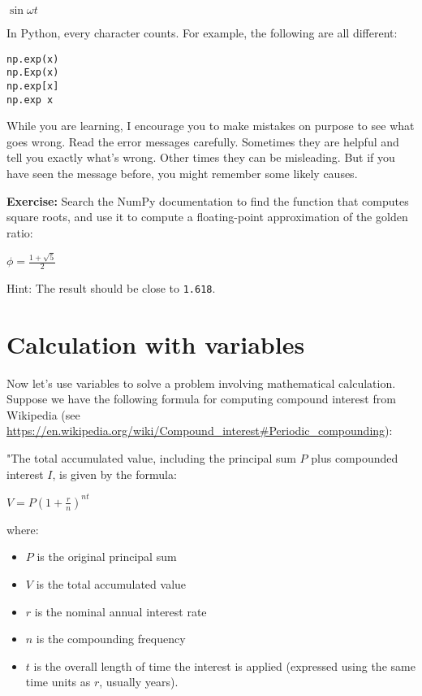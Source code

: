 \(\sin \omega t\)

In Python, every character counts. For example, the following are all
different:

\begin{lstlisting}[style=output]
np.exp(x)
np.Exp(x)
np.exp[x]
np.exp x
\end{lstlisting}

While you are learning, I encourage you to make mistakes on purpose to
see what goes wrong. Read the error messages carefully. Sometimes they
are helpful and tell you exactly what's wrong. Other times they can be
misleading. But if you have seen the message before, you might remember
some likely causes.

\textbf{Exercise:} Search the NumPy documentation to find the function
that computes square roots, and use it to compute a floating-point
approximation of the golden ratio:

\(\phi = \frac{1 + \sqrt{5}}{2}\)

Hint: The result should be close to \passthrough{\lstinline!1.618!}.

\hypertarget{calculation-with-variables}{%
\section{Calculation with variables}\label{calculation-with-variables}}

Now let's use variables to solve a problem involving mathematical
calculation. Suppose we have the following formula for computing
compound interest from Wikipedia (see
\url{https://en.wikipedia.org/wiki/Compound_interest\#Periodic_compounding}):

"The total accumulated value, including the principal sum \(P\) plus
compounded interest \(I\), is given by the formula:

\(V=P\left(1+{\frac {r}{n}}\right)^{nt}\)

where:

\begin{itemize}
\tightlist
\item
  \(P\) is the original principal sum
\item
  \(V\) is the total accumulated value
\item
  \(r\) is the nominal annual interest rate
\item
  \(n\) is the compounding frequency
\item
  \(t\) is the overall length of time the interest is applied (expressed
  using the same time units as \(r\), usually years).
\end{itemize}

